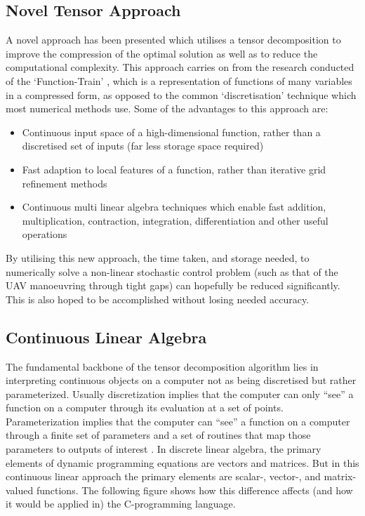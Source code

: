 \documentclass[11pt,draftd]{article}
\begin{document}
\subsection{Novel Tensor Approach}
A novel approach has been presented which utilises a tensor decomposition to improve the compression of the optimal solution as well as to reduce the computational complexity. This approach carries on from the research conducted of the ‘Function-Train’ \cite{ft-alex}, which is a representation of functions of many variables in a compressed form, as opposed to the common ‘discretisation’ technique which most numerical methods use. Some of the advantages to this approach are:
\begin{itemize}
	\item Continuous input space of a high-dimensional function, rather than a discretised set of inputs (far less storage space required)
	\item Fast adaption to local features of a function, rather than iterative grid refinement methods
	\item Continuous multi linear algebra techniques which enable fast addition, multiplication, contraction, integration, differentiation and other useful operations
\end{itemize}
\noindent By utilising this new approach, the time taken, and storage needed, to numerically solve a non-linear stochastic control problem (such as that of the UAV manoeuvring through tight gaps) can hopefully be reduced significantly. This is also hoped to be accomplished without losing needed accuracy.\\

\subsection{Continuous Linear Algebra}
The fundamental backbone of the tensor decomposition algorithm lies in interpreting continuous objects on a computer not as being discretised but rather parameterized. Usually discretization implies that the computer can only “see” a function on a computer through its evaluation at a set of points. Parameterization implies that the computer can “see” a function on a computer through a finite set of parameters and a set of routines that map those parameters to outputs of interest \cite{thesis}. In discrete linear algebra, the primary elements of dynamic programming equations are vectors and matrices. But in this continuous linear approach the primary elements are scalar-, vector-, and matrix-valued functions. The following figure shows how this difference affects (and how it would be applied in) the C-programming language.
\end{document}
